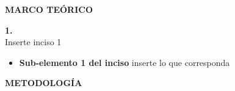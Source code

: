 \documentclass[12pt]{article}
\begin{document}
	\newpage
	
	
	\begin{center}
		\textbf{\large MARCO TEÓRICO}\\
	\end{center}
	
	\textbf{1. }\\
	
	Inserte inciso 1
	
	\begin{itemize}
		\item \textbf{Sub-elemento 1 del inciso } inserte lo que corresponda
		
	\end{itemize}

	\newpage
	
	\begin{center}
		\textbf{\large METODOLOGÍA}\\
	\end{center}
	
	\renewcommand{\theenumi}{\alph{enumi}} %
	
\end{document}
